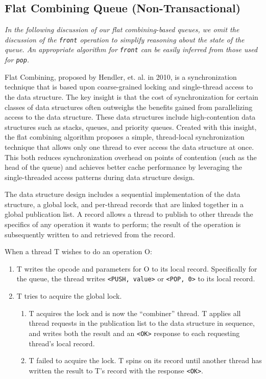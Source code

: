 \subsection{Flat Combining Queue (Non-Transactional)}
\label{fcqueuent}

\emph{In the following discussion of our flat combining-based queues, we omit the discussion of the \texttt{front} operation to simplify reasoning about the state of the queue. An appropriate algorithm for \texttt{front} can be easily inferred from those used for \texttt{pop}.}

Flat Combining, proposed by Hendler, et. al. in 2010\cite{flatcombining}, is a synchronization technique that is based upon coarse-grained locking and single-thread access to the data structure. The key insight is that the cost of synchronization for certain classes of data structures often outweighs the benefits gained from parallelizing access to the data structure. These data structures include high-contention data structures such as stacks, queues, and priority queues. Created with this insight, the flat combining algorithm proposes a simple, thread-local synchronization technique that allows only one thread to ever access the data structure at once. This both reduces synchronization overhead on points of contention (such as the head of the queue) and achieves better cache performance by leveraging the single-threaded access patterns during data structure design.

The data structure design includes a sequential implementation of the data structure, a global lock, and per-thread records that are linked together in a global publication list. A record allows a thread to publish to other threads the specifics of any operation it wants to perform; the result of the operation is subsequently written to and retrieved from the record.

When a thread T wishes to do an operation O:
\begin{enumerate}
    \item T writes the opcode and parameters for O to its local record. Specifically for the queue, the thread writes \texttt{<PUSH, value>} or \texttt{<POP, 0>} to its local record.
   \item T tries to acquire the global lock.
   \begin{enumerate}
        \item T acquires the lock and is now the “combiner” thread. T applies all thread requests in the publication list to the data structure in sequence, and writes both the result and an \texttt{<OK>} response to each requesting thread's local record.
        \item T failed to acquire the lock. T spins on its record until another thread has written the result to T's record with the response \texttt{<OK>}.
    \end{enumerate}
\end{enumerate}


